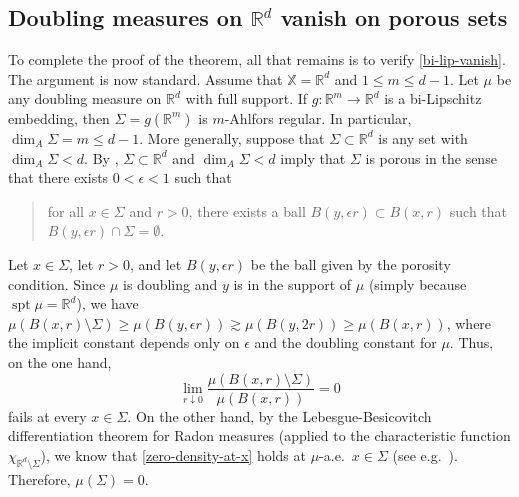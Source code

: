 \documentclass[12pt]{amsart}
\theoremstyle{definition}
\theoremstyle{remark}
\newcommand{\RR}{\mathbb{R}}
\newcommand{\XX}{\mathbb{X}}
\newcommand{\spt}{\mathop\mathrm{spt}\nolimits}
\numberwithin{figure}{section}
\numberwithin{equation}{section}
\begin{document}
\subsection{Doubling measures on $\RR^d$ vanish on porous sets}\label{ss:porous} To complete the proof of the theorem, all that remains is to verify \eqref{bi-lip-vanish}. The argument is now standard. Assume that $\XX=\RR^d$ and $1\leq m\leq d-1$. Let $\mu$ be any doubling measure on $\RR^d$ with full support. If $g:\RR^m\rightarrow\RR^d$ is a bi-Lipschitz embedding, then $\Sigma=g(\RR^m)$ is $m$-Ahlfors regular. In particular, $\dim_A \Sigma=m\leq d-1$. More generally, suppose that $\Sigma\subset\RR^d$ is any set with $\dim_A \Sigma<d$. By \cite[Theorem 5.2]{Luukk}, $\Sigma\subset\RR^d$ and $\dim_A \Sigma<d$ imply that $\Sigma$ is porous in the sense that there exists $0<\epsilon<1$ such that \begin{quotation}for all $x\in \Sigma$ and $r>0$, there exists a ball $B(y,\epsilon r)\subset B(x,r)$ such that $B(y,\epsilon r)\cap \Sigma=\emptyset$. \end{quotation} Let $x\in\Sigma$, let $r>0$, and let $B(y,\epsilon r)$ be the ball given by the porosity condition. Since $\mu$ is doubling and $y$ is in the support of $\mu$ (simply because $\spt\mu=\RR^d$), we have $\mu(B(x,r)\setminus\Sigma)\geq \mu(B(y,\epsilon r))\gtrsim \mu(B(y,2r))\geq \mu(B(x,r))$, where the implicit constant depends only on $\epsilon$ and the doubling constant for $\mu$. Thus, on the one hand, \begin{equation} \label{zero-density-at-x} \lim_{r\downarrow 0} \frac{\mu(B(x,r)\setminus\Sigma)}{\mu(B(x,r))}=0\end{equation} fails at every $x\in\Sigma$. On the other hand, by the Lebesgue-Besicovitch differentiation theorem for Radon measures (applied to the characteristic function $\chi_{\RR^d\setminus\Sigma}$), we know that \eqref{zero-density-at-x} holds at $\mu$-a.e.~$x\in\Sigma$ (see e.g.~\cite[Corollary 2.4]{Mattila}). Therefore, $\mu(\Sigma)=0$.



\end{document}
